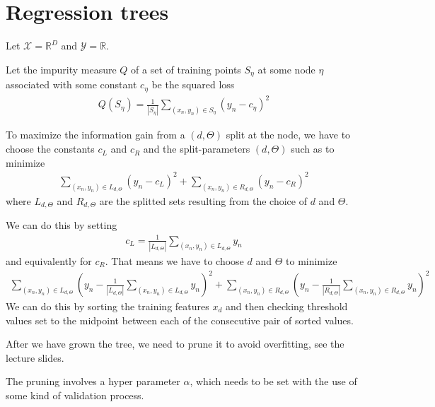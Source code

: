 \documentclass[12pt]{article}
\begin{document}
\section{Regression trees}

Let $\mathcal{X} = \mathbb{R}^D$ and $\mathcal{Y}=\mathbb{R}$.

Let the impurity measure $Q$ of a set of training points $S_\eta$ at some node $\eta$ associated with some constant $c_\eta$ be the squared loss
\begin{align}
Q(S_\eta) = \frac{1}{|S_\eta|} \sum_{(x_n,y_n) \in S_\eta} (y_n - c_\eta)^2
\end{align}

To maximize the information gain from a $(d, \Theta)$ split at the node, we have to choose the constants $c_L$ and $c_R$ and the split-parameters $(d,\Theta)$ such as to minimize
\begin{align}
 \sum_{(x_n,y_n) \in L_{d,\Theta}} (y_n - c_L)^2 + \sum_{(x_n,y_n) \in R_{d,\Theta}} (y_n - c_R)^2
\end{align}
where $L_{d,\Theta}$ and $R_{d,\Theta}$ are the splitted sets resulting from the choice of $d$ and $\Theta$.

We can do this by setting 
\begin{align}
c_L = \frac{1}{|L_{d,\Theta}|} \sum_{(x_n,y_n) \in L_{d,\Theta}} y_n
\end{align}
and equivalently for $c_R$. That means we have to choose $d$ and $\Theta$ to minimize
\begin{align}
 \sum_{(x_n,y_n) \in L_{d,\Theta}} (y_n - \frac{1}{|L_{d,\Theta}|} \sum_{(x_n,y_n) \in L_{d,\Theta}} y_n)^2 + \sum_{(x_n,y_n) \in R_{d,\Theta}} (y_n - \frac{1}{|R_{d,\Theta}|} \sum_{(x_n,y_n) \in R_{d,\Theta}} y_n)^2
\end{align}
We can do this by sorting the training features $x_d$ and then checking threshold values set to the midpoint between each of the consecutive pair of sorted values.

After we have grown the tree, we need to prune it to avoid overfitting, see the lecture slides.

The pruning involves a hyper parameter $\alpha$, which needs to be set with the use of some kind of validation process.
\end{document}
